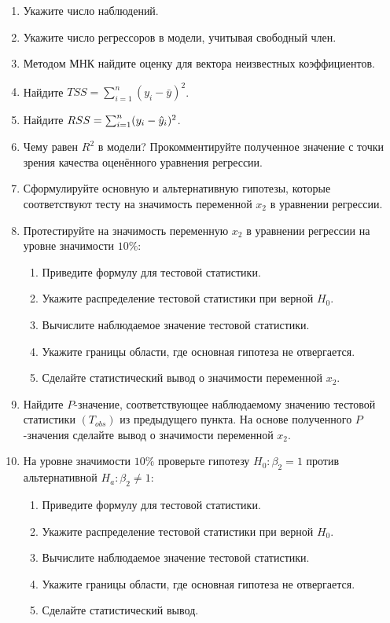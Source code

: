 \begin{problem}
\begin{enumerate}
\item Укажите число наблюдений.
\item Укажите число регрессоров в модели, учитывая свободный член.
\item Методом МНК найдите оценку для вектора неизвестных коэффициентов.
\item Найдите $TSS = \sum_{i=1}^n (y_i - \bar y)^2$.
\item Найдите $RSS = \sum_{i=1}^n (y_i - \hat{y}_i)^2$.
\item Чему равен $R^2$ в модели? Прокомментируйте полученное значение с точки зрения качества оценённого уравнения регрессии.
\item Сформулируйте основную и альтернативную гипотезы, которые соответствуют тесту на значимость переменной $x_2$ в уравнении регрессии.
\item Протестируйте на значимость переменную $x_2$ в уравнении регрессии на уровне значимости $10\%$:
\begin{enumerate}
\item Приведите формулу для тестовой статистики.
\item Укажите распределение тестовой статистики при верной $H_0$.
\item Вычислите наблюдаемое значение тестовой статистики.
\item Укажите границы области, где основная гипотеза не отвергается.
\item Сделайте статистический вывод о значимости переменной $x_2$.
\end{enumerate}
\item Найдите $P$-значение, соответствующее наблюдаемому значению тестовой статистики $(T_{obs})$ из предыдущего пункта. На основе полученного $P$-значения сделайте вывод о значимости переменной $x_2$.
\item На уровне значимости $10\%$ проверьте гипотезу $H_0: \beta_2 = 1$ против альтернативной $H_a: \beta_2 \not= 1$:
\begin{enumerate}
\item Приведите формулу для тестовой статистики.
\item Укажите распределение тестовой статистики при верной $H_0$.
\item Вычислите наблюдаемое значение тестовой статистики.
\item Укажите границы области, где основная гипотеза не отвергается.
\item Сделайте статистический вывод.
\end{enumerate}

\end{enumerate}
\end{problem}
